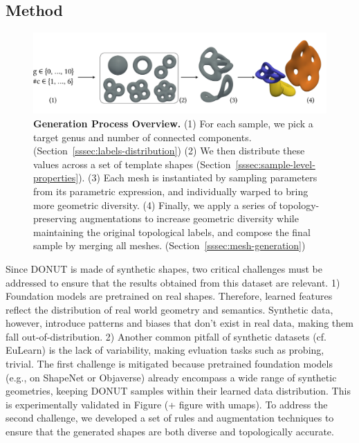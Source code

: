 \subsection{Method}
\label{ssec:topogen-method}

\begin{figure}[t]
  \centering
  \includegraphics[width=1.0\linewidth]{figs/topogen/topogen_gen.pdf}
   \caption{\textbf{Generation Process Overview.} (1) For each sample, we pick a target genus and number of connected components. (Section~\ref{sssec:labels-distribution}) (2) We then distribute these values across a set of template shapes (Section~\ref{sssec:sample-level-properties}). (3) Each mesh is instantiated by sampling parameters from its parametric expression, and individually warped to bring more geometric diversity. (4) Finally, we apply a series of topology-preserving augmentations to increase geometric diversity while maintaining the original topological labels, and compose the final sample by merging all meshes. (Section~\ref{sssec:mesh-generation})}
   \label{fig:topogen-overview}
\end{figure}

Since DONUT is made of synthetic shapes, two critical challenges must be addressed to ensure that the results obtained from this dataset are relevant. 1) Foundation models are pretrained on real shapes. Therefore, learned features reflect the distribution of real world geometry and semantics. Synthetic data, however, introduce patterns and biases that don't exist in real data, making them fall out-of-distribution. 2) Another common pitfall of synthetic datasets (cf. EuLearn) is the lack of variability, making evluation tasks such as probing, trivial. The first challenge is mitigated because pretrained foundation models (e.g., on ShapeNet or Objaverse) already encompass a wide range of synthetic geometries, keeping DONUT samples within their learned data distribution. This is experimentally validated in Figure (+ figure with umaps). To address the second challenge, we developed a set of rules and augmentation techniques to ensure that the generated shapes are both diverse and topologically accurate.

